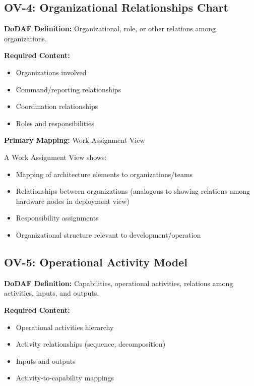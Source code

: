 \documentclass[11pt]{article}
\begin{document}
\subsection{OV-4: Organizational Relationships Chart}

\begin{dodafbox}
\textbf{DoDAF Definition:} Organizational, role, or other relations among organizations.

\textbf{Required Content:}
\begin{itemize}[nosep]
    \item Organizations involved
    \item Command/reporting relationships
    \item Coordination relationships
    \item Roles and responsibilities
\end{itemize}
\end{dodafbox}

\begin{vbbox}
\textbf{Primary Mapping:} Work Assignment View

A Work Assignment View shows:
\begin{itemize}
    \item Mapping of architecture elements to organizations/teams
    \item Relationships between organizations (analogous to showing relations among hardware nodes in deployment view)
    \item Responsibility assignments
    \item Organizational structure relevant to development/operation
\end{itemize}
\end{vbbox}

\subsection{OV-5: Operational Activity Model}

\begin{dodafbox}
\textbf{DoDAF Definition:} Capabilities, operational activities, relations among activities, inputs, and outputs.

\textbf{Required Content:}
\begin{itemize}[nosep]
    \item Operational activities hierarchy
    \item Activity relationships (sequence, decomposition)
    \item Inputs and outputs
    \item Activity-to-capability mappings
\end{itemize}
\end{dodafbox}
\end{document}
